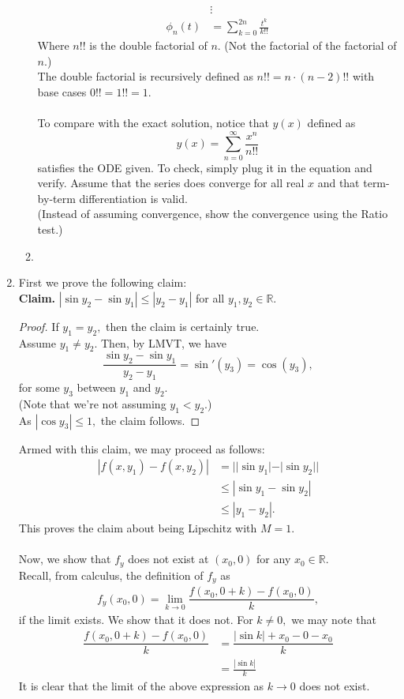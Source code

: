 \documentclass[12pt]{article}
\theoremstyle{definition}
\numberwithin{thm}{section}
\begin{document}
\begin{enumerate}[leftmargin=*, label = Q.\arabic*.]
\begin{enumerate}[label = (\roman*)]
\begin{align*}
			&\vdots\\
			\phi_n(t) &= \sum_{k=0}^{2n}\frac{t^{k}}{k!!}
		\end{align*}
		Where $n!!$ is the double factorial of $n.$ (Not the factorial of the factorial of $n.$)\\
		The double factorial is recursively defined as $n!! = n\cdot(n - 2)!!$ with base cases $0!! = 1!! = 1.$\\~\\
		To compare with the exact solution, notice that $y(x)$ defined as
		\[y(x) = \sum_{n=0}^{\infty}\frac{x^n}{n!!}\]
		satisfies the ODE given. To check, simply plug it in the equation and verify. Assume that the series does converge for all real $x$ and that term-by-term differentiation is valid.\\
		(Instead of assuming convergence, show the convergence using the Ratio test.)
		\item %
	\end{enumerate}
	\item First we prove the following claim:\\
	\textbf{Claim.} $|\sin y_2 - \sin y_1| \le |y_2 - y_1|$ for all $y_1, y_2 \in \mathbb{R}.$
	\begin{proof} 
		If $y_1 = y_2,$ then the claim is certainly true.\\
		Assume $y_1 \neq y_2.$ Then, by LMVT, we have
		\[\frac{\sin y_2 - \sin y_1}{y_2 - y_1} = \sin'(y_3) = \cos(y_3),\]
		for some $y_3$ between $y_1$ and $y_2.$\\
		(Note that we're not assuming $y_1 < y_2.$)\\
		As $|\cos y_3| \le 1,$ the claim follows.
	\end{proof}
	Armed with this claim, we may proceed as follows:
	\begin{align*} 
		|f(x, y_1) - f(x, y_2)| &= ||\sin y_1| - |\sin y_2||\\
		&\le |\sin y_1 - \sin y_2|\\
		&\le |y_1 - y_2|.
	\end{align*}
	This proves the claim about being Lipschitz with $M = 1.$\\~\\
	Now, we show that $f_y$ does not exist at $(x_0, 0)$ for any $x_0 \in \mathbb{R}.$\\
	Recall, from calculus, the definition of $f_y$ as
	\begin{align*} 
		f_y(x_0, 0) = \lim_{k\to 0}\dfrac{f(x_0, 0 + k) - f(x_0, 0)}{k},
	\end{align*}
	if the limit exists. We show that it does not. For $k \neq 0,$ we may note that
	\begin{align*} 
		\dfrac{f(x_0, 0 + k) - f(x_0, 0)}{k} &= \dfrac{|\sin k| + x_0 - 0 - x_0}{k}\\
		&= \frac{|\sin k|}{k}
	\end{align*}
	It is clear that the limit of the above expression as $k \to 0$ does not exist.
\end{enumerate}
\end{document}
